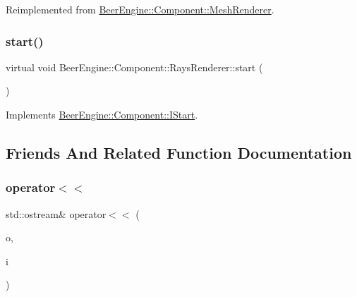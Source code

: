 Reimplemented from \mbox{\hyperlink{class_beer_engine_1_1_component_1_1_mesh_renderer_abca4caa865363fdccb1b0c6fc6f7c81d}{Beer\+Engine\+::\+Component\+::\+Mesh\+Renderer}}.

\mbox{\label{class_beer_engine_1_1_component_1_1_rays_renderer_a309d7940148feada1c9497e2444a6548}} 
\subsubsection{\texorpdfstring{start()}{start()}}
{\footnotesize\ttfamily virtual void Beer\+Engine\+::\+Component\+::\+Rays\+Renderer\+::start (\begin{DoxyParamCaption}{ }\end{DoxyParamCaption})\hspace{0.3cm}{\ttfamily [virtual]}}



Implements \mbox{\hyperlink{class_beer_engine_1_1_component_1_1_i_start_aa3e25e86e20c46cdaefc6f6d7f21e495}{Beer\+Engine\+::\+Component\+::\+I\+Start}}.



\subsection{Friends And Related Function Documentation}
\mbox{\label{class_beer_engine_1_1_component_1_1_rays_renderer_a836618cc9ceb165dceabafb52cbf742f}} 
\subsubsection{\texorpdfstring{operator$<$$<$}{operator<<}}
{\footnotesize\ttfamily std\+::ostream\& operator$<$$<$ (\begin{DoxyParamCaption}\item[{std\+::ostream \&}]{o,  }\item[{\mbox{\hyperlink{class_beer_engine_1_1_component_1_1_rays_renderer}{Rays\+Renderer}} const \&}]{i }\end{DoxyParamCaption})\hspace{0.3cm}{\ttfamily [friend]}}



